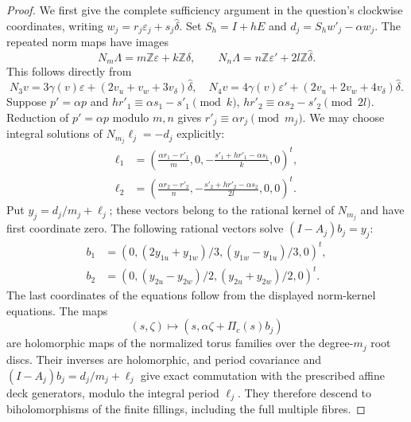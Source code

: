 \begin{proof}
We first give the complete sufficiency argument in the question's
clockwise coordinates, writing $w_j=r_j\varepsilon_j+s_j\widehat\delta$.
Set $S_h=I+hE$ and $d_j=S_hw'_j-\alpha w_j$.
The repeated norm maps have images
\[
 N_m\Lambda=m\mathbb Z\varepsilon+k\mathbb Z\widehat\delta,
 \qquad
 N_n\Lambda=n\mathbb Z\varepsilon'+2l\mathbb Z\widehat\delta.
\]
This follows directly from
\[
 N_3v=3\gamma(v)\varepsilon+(2v_u+v_w+3v_\delta)\widehat\delta,
 \quad
 N_4v=4\gamma(v)\varepsilon'+(2v_u+2v_w+4v_\delta)\widehat\delta.
\]
Suppose $p'=\alpha p$ and
$hr'_1\equiv\alpha s_1-s'_1\pmod k$,
$hr'_2\equiv\alpha s_2-s'_2\pmod{2l}$.
Reduction of $p'=\alpha p$ modulo $m,n$ gives
$r'_j\equiv\alpha r_j\pmod{m_j}$.
We may choose integral solutions of $N_{m_j}\ell_j=-d_j$ explicitly:
\[
 \begin{split}
 \ell_1&=\left(\frac{\alpha r_1-r'_1}{m},0,
 -\frac{s'_1+hr'_1-\alpha s_1}{k},0\right)^t,\\
 \ell_2&=\left(\frac{\alpha r_2-r'_2}{n},
 -\frac{s'_2+hr'_2-\alpha s_2}{2l},0,0\right)^t.
 \end{split}
\]
Put $y_j=d_j/m_j+\ell_j$; these vectors belong to the rational
kernel of $N_{m_j}$ and have first coordinate zero.
The following rational vectors solve $(I-A_j)b_j=y_j$:
\[
 \begin{split}
 b_1&=(0,(2y_{1u}+y_{1w})/3,(y_{1w}-y_{1u})/3,0)^t,\\
 b_2&=(0,(y_{2u}-y_{2w})/2,(y_{2u}+y_{2w})/2,0)^t.
 \end{split}
\]
The last coordinates of the equations follow from the displayed
norm-kernel equations.  The maps
\[
 (s,\zeta)\longmapsto(s,\alpha\zeta+\Pi_c(s)b_j)
\]
are holomorphic maps of the normalized torus families over the
degree-$m_j$ root discs.  Their inverses are holomorphic, and period
covariance and $(I-A_j)b_j=d_j/m_j+\ell_j$ give exact commutation
with the prescribed affine deck generators, modulo the integral
period $\ell_j$.  They therefore descend to biholomorphisms of the
finite fillings, including the full multiple fibres.


\end{proof}
